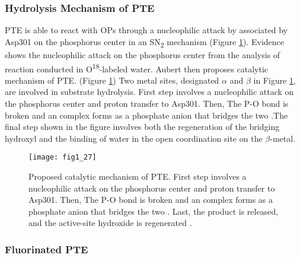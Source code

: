 \begin{refsection}
\subsubsection{Hydrolysis Mechanism of PTE}

PTE is able to react with OPs through a nucleophilic attack by 
associated by Asp301 on the phosphorus center in an SN\textsubscript{2}
mechanism\cite{Lewis1988} (Figure \ref{fig:pte-mechanism}).  Evidence shows the
nucleophilic attack on the phosphorus center from the analysis of reaction
conducted in O\textsuperscript{18}-labeled water\cite{Lewis1988}.  Aubert
 then proposes catalytic mechanism of PTE\cite{Aubert2004}.
(Figure \ref{fig:pte-mechanism}) Two metal sites, designated $\alpha$ and
$\beta$ in Figure \ref{fig:pte-mechanism}\cite{Aubert2004}, are involved in
substrate hydrolysis. First step involves a nucleophilic attack on the
phosphorus center and proton transfer to Asp301. Then, The P-O bond is broken
and an complex forms as a phosphate anion that bridges the two .The
final step shown in the figure involves both the regeneration of the bridging
hydroxyl and the binding of water in the open coordination site on the
$\beta$-metal.
\begin{figure}[h!] \centering \texttt{[image: fig1\_27]}
    \caption[Proposed catalytic mechanism of PTE. First step involves a
    nucleophilic attack on the phosphorus center and proton transfer to Asp301.
Then, The P-O bond is broken and an complex forms as a phosphate anion that
bridges the two . Last, the product is released, and the
active-site hydroxide is regenerated.]{Proposed catalytic mechanism of PTE.
    First step involves a nucleophilic attack on the phosphorus center and
    proton transfer to Asp301. Then, The P-O bond is broken and an complex
    forms as a phosphate anion that bridges the two . Last, the
    product is released, and the active-site hydroxide is regenerated
    \cite{Aubert2004}.} \label{fig:pte-mechanism} \end{figure}

\subsubsection{Fluorinated PTE}


\end{refsection}
